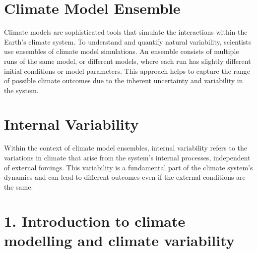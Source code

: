 \documentclass[
]{krantz}
\begin{document}
\section{Climate Model Ensemble}\label{climate-model-ensemble}

Climate models are sophisticated tools that simulate the interactions within the Earth's climate system. To understand and quantify natural variability, scientists use ensembles of climate model simulations. An ensemble consists of multiple runs of the same model, or different models, where each run has slightly different initial conditions or model parameters. This approach helps to capture the range of possible climate outcomes due to the inherent uncertainty and variability in the system.

\section{Internal Variability}\label{internal-variability}

Within the context of climate model ensembles, internal variability refers to the variations in climate that arise from the system's internal processes, independent of external forcings. This variability is a fundamental part of the climate system's dynamics and can lead to different outcomes even if the external conditions are the same.

\section{1. Introduction to climate modelling and climate variability}\label{introduction-to-climate-modelling-and-climate-variability}
\end{document}
